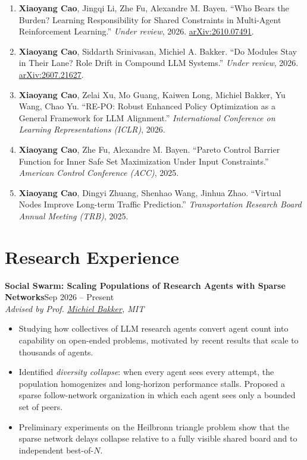 \documentclass[10pt,letterpaper]{article}
\newcommand{\ulink}[2]{\href{#1}{\underline{#2}}}
\newcommand{\project}[3]{%
  \vspace{6pt}%
  {#1}\hfill #2\\
  \textit{#3}\par\vspace{2pt}}
\begin{document}
\begin{enumerate}
  \item \textbf{Xiaoyang Cao}, Jingqi Li, Zhe Fu, Alexandre M. Bayen. ``Who Bears the Burden? Learning Responsibility for
    Shared Constraints in Multi-Agent Reinforcement Learning.'' \textit{Under review}, 2026.
    \href{https://arxiv.org/abs/2610.07491}{arXiv:2610.07491}.
  \item \textbf{Xiaoyang Cao}, Siddarth Srinivasan, Michiel A. Bakker. ``Do Modules Stay in Their Lane? Role Drift in
    Compound LLM Systems.'' \textit{Under review}, 2026.
    \href{https://arxiv.org/abs/2607.21627}{arXiv:2607.21627}.
  \item \textbf{Xiaoyang Cao}, Zelai Xu, Mo Guang, Kaiwen Long, Michiel Bakker, Yu Wang, Chao Yu. ``RE-PO: Robust
    Enhanced Policy Optimization as a General Framework for LLM Alignment.'' \textit{International Conference on
    Learning Representations (ICLR)}, 2026.
  \item \textbf{Xiaoyang Cao}, Zhe Fu, Alexandre M. Bayen. ``Pareto Control Barrier Function for Inner Safe Set Maximization
    Under Input Constraints.'' \textit{American Control Conference (ACC)}, 2025.
  \item \textbf{Xiaoyang Cao}, Dingyi Zhuang, Shenhao Wang, Jinhua Zhao. ``Virtual Nodes Improve Long-term Traffic
    Prediction.'' \textit{Transportation Research Board Annual Meeting (TRB)}, 2025.
\end{enumerate}

\section{Research Experience}

\vspace{-6pt}
\project{\textbf{Social Swarm: Scaling Populations of Research Agents with Sparse Networks}}{Sep 2026 -- Present}
        {Advised by Prof. \ulink{https://miba.dev/}{Michiel Bakker}, MIT}
\begin{itemize}
  \item Studying how collectives of LLM research agents convert agent count into capability on open-ended problems,
    motivated by recent results that scale to thousands of agents.
  \item Identified \textit{diversity collapse}: when every agent sees every attempt, the population homogenizes and long-horizon
    performance stalls. Proposed a sparse follow-network organization in which each agent sees only a bounded set
    of peers.
  \item Preliminary experiments on the Heilbronn triangle problem show that the sparse network delays collapse relative
    to a fully visible shared board and to independent best-of-$N$.
\end{itemize}
\end{document}

